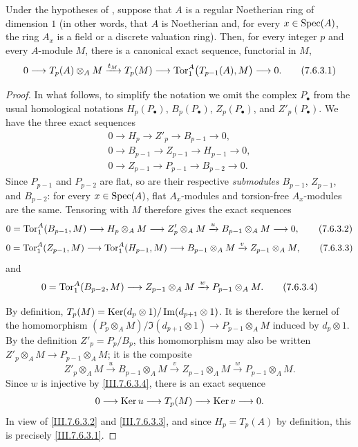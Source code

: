 \begin{proposition}[7.6.3]
\label{III.7.6.3}
Under the hypotheses of , suppose that $A$ is
a regular Noetherian ring of dimension $1$ (in other words,
that $A$ is Noetherian and, for every $x\in\operatorname{Spec}(A)$, the ring
$A_x$ is a field or a discrete valuation ring).  Then, for
every integer $p$ and every $A$-module $M$, there is a
canonical exact sequence, functorial in $M$,
\[
  0
  \longrightarrow T_p(A)\otimes_A M
  \xrightarrow{t_M} T_p(M)
  \longrightarrow
  \operatorname{Tor}_1^A\bigl(T_{p-1}(A),M\bigr)
  \longrightarrow 0.
  \tag{7.6.3.1}\label{III.7.6.3.1}
\]
\end{proposition}

\begin{proof}
In what follows, to simplify the notation we omit the complex
$P_\bullet$ from the usual homological notations
$H_p(P_\bullet)$, $B_p(P_\bullet)$, $Z_p(P_\bullet)$, and
$Z'_p(P_\bullet)$.  We have the three exact sequences
\begin{gather*}
  0\longrightarrow H_p\longrightarrow Z'_p
  \longrightarrow B_{p-1}\longrightarrow 0,\\
  0\longrightarrow B_{p-1}\longrightarrow Z_{p-1}
  \longrightarrow H_{p-1}\longrightarrow 0,\\
  0\longrightarrow Z_{p-1}\longrightarrow P_{p-1}
  \longrightarrow B_{p-2}\longrightarrow 0.
\end{gather*}
Since $P_{p-1}$ and $P_{p-2}$ are flat, so are their
respective \emph{submodules} $B_{p-1}$, $Z_{p-1}$, and $B_{p-2}$:
for every $x\in\operatorname{Spec}(A)$, flat $A_x$-modules and torsion-free
$A_x$-modules are the same.  Tensoring with $M$ therefore
gives the exact sequences
\[
  0=\operatorname{Tor}_1^A(B_{p-1},M)
  \longrightarrow H_p\otimes_A M
  \longrightarrow Z'_p\otimes_A M
  \xrightarrow{u}B_{p-1}\otimes_A M
  \longrightarrow 0,
  \tag{7.6.3.2}\label{III.7.6.3.2}
\]
\[
  0=\operatorname{Tor}_1^A(Z_{p-1},M)
  \longrightarrow \operatorname{Tor}_1^A(H_{p-1},M)
  \longrightarrow B_{p-1}\otimes_A M
  \xrightarrow{v} Z_{p-1}\otimes_A M,
  \tag{7.6.3.3}\label{III.7.6.3.3}
\]
and
\[
  0=\operatorname{Tor}_1^A(B_{p-2},M)
  \longrightarrow Z_{p-1}\otimes_A M
  \xrightarrow{w}P_{p-1}\otimes_A M.
  \tag{7.6.3.4}\label{III.7.6.3.4}
\]

By definition, $T_p(M)=
\operatorname{Ker}(d_p\otimes 1)/\operatorname{Im}(d_{p+1}\otimes 1)$.
It is therefore the kernel of the homomorphism $(P_p\otimes_A M)/\Im(d_{p+1}\otimes 1)
\longrightarrow P_{p-1}\otimes_A M$
induced by $d_p\otimes 1$.  By the definition
$Z'_p=P_p/B_p$, this homomorphism may also be written
$Z'_p\otimes_A M\to P_{p-1}\otimes_A M$; it is the composite
\[
  Z'_p\otimes_A M
  \xrightarrow{u}B_{p-1}\otimes_A M
  \xrightarrow{v}Z_{p-1}\otimes_A M
  \xrightarrow{w}P_{p-1}\otimes_A M.
\]
Since $w$ is injective by \eqref{III.7.6.3.4}, there is an
exact sequence
\[
  0\longrightarrow\operatorname{Ker} u\longrightarrow T_p(M)
  \longrightarrow\operatorname{Ker} v\longrightarrow 0.
\]
In view of \eqref{III.7.6.3.2} and
\eqref{III.7.6.3.3}, and since $H_p=T_p(A)$ by definition,
this is precisely \eqref{III.7.6.3.1}.
\end{proof}

